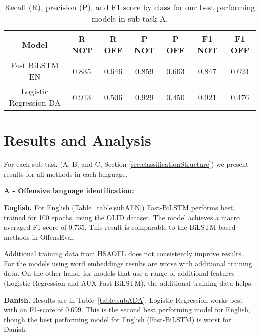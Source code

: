 \documentclass{article}
\begin{document}
\begin{table*}
\small
\centering
\caption{Recall (R), precision (P), and F1 score by class for our best performing models in sub-task A.}
\begin{tabular}{c|c|c|c|c|c|c}
\textbf{Model} & \textbf{R NOT} & \textbf{R OFF} & \textbf{P NOT} & \textbf{P OFF} & \textbf{F1 NOT} & \textbf{F1 OFF} \\\hline
Fast BiLSTM EN & 0.835      & 0.646      & 0.859         & 0.603         & 0.847  & 0.624  \\
Logistic Regression DA & 0.913      & 0.506      & 0.929         & 0.450         & 0.921  & 0.476 \\
\end{tabular}
\label{table:subABest}
\end{table*}





\section{Results and Analysis}
\label{ch:results}



For each sub-task (A, B, and C, Section \ref{sec:classificationStructure}) we present results for all methods in each language.



\textbf{A - Offensive language identification:}\label{sec:resultsSubA}


\textbf{English.} For English (Table~\ref{table:subAEN}) Fast-BiLSTM performs best, trained for 100 epochs, using the OLID dataset. The model achieves a macro averaged F1-score of $0.735$. This result is comparable to the BiLSTM based methods in OffensEval. 

Additional training data from  HSAOFL \cite{davidson2017automated} does not consistently improve results. For the models using word embeddings results are worse with additional training data. 
On the other hand, for models that use a range of additional features (Logistic Regression and AUX-Fast-BiLSTM), the additional training data helps. 

\textbf{Danish.} Results are in Table~\ref{table:subADA}. Logistic Regression works best with an F1-score of $0.699$. This is the second best performing model for English, though the best performing model for English (Fast-BiLSTM) is worst for Danish. 
\end{document}
